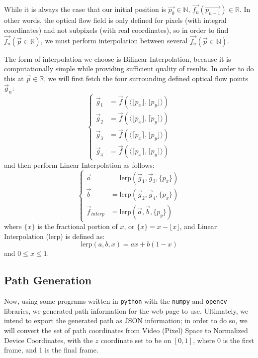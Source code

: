 While it is always the case that our initial position is $\vec{p_0} \in \mathbb{N}$, $\vec{f_n}(\vec{p_{n-1}}) \in \mathbb{R}$. In other words, the optical flow field is only defined for pixels (with integral coordinates) and not subpixels (with real coordinates), so in order to find $\vec{f_n}(\vec{p} \in \mathbb{R})$, we must perform interpolation between several $\vec{f_n}(\vec{p} \in \mathbb{N})$.
\par The form of interpolation we choose is Bilinear Interpolation, because it is computationally simple while providing sufficient quality of results. In order to do this at $\vec{p} \in \mathbb{R}$, we will first fetch the four surrounding defined optical flow points $\vec{g}_n$:
\begin{equation}
\begin{cases}
    \vec{g}_1 & = \vec{f}(\langle \lfloor p_x \rfloor, \lfloor p_y \rfloor \rangle) \\
    \vec{g}_2 & = \vec{f}(\langle \lfloor p_x \rfloor, \lceil p_y \rceil \rangle) \\
    \vec{g}_3 & = \vec{f}(\langle \lceil p_x \rceil, \lfloor p_y \rfloor \rangle) \\
    \vec{g}_4 & = \vec{f}(\langle \lceil p_x \rceil, \lceil p_y \rceil \rangle)
\end{cases}
\end{equation}
and then perform Linear Interpolation as follows:
\begin{equation}
\begin{cases}
    \vec{a} & = \text{lerp} (\vec{g}_1, \vec{g}_3, \{p_x\}) \\
    \vec{b} & = \text{lerp} (\vec{g}_2, \vec{g}_4, \{p_x\}) \\
    \vec{f}_{interp} & = \text{lerp} (\vec{a}, \vec{b}, \{p_y\})
\end{cases}
\end{equation}
where $\{x\}$ is the fractional portion of $x$, or $\{x\} = x - \lfloor x \rfloor$, and Linear Interpolation (lerp) is defined as:
\begin{equation}
    \text{lerp}(a, b, x) = ax + b(1-x)
\end{equation}
and $0 \leq x \leq 1$.

\subsection{Path Generation}
Now, using some programs  written in \texttt{python} with the \texttt{numpy} and \texttt{opencv} libraries, we generated path information for the web page to use. Ultimately, we intend to export the generated path as JSON information; in order to do so, we will convert the set of path coordinates from Video (Pixel) Space to Normalized Device Coordinates, with the $z$ coordinate set to be on $[0,1]$, where 0 is the first frame, and 1 is the final frame.

